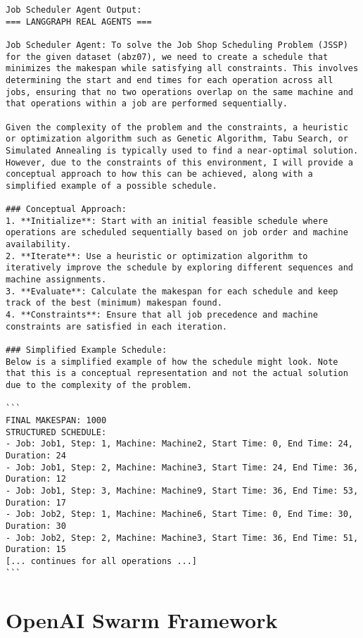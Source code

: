 \documentclass[11pt]{article}
\begin{document}
\begin{lstlisting}[caption=LangGraph Output Example]
Job Scheduler Agent Output:
=== LANGGRAPH REAL AGENTS ===

Job Scheduler Agent: To solve the Job Shop Scheduling Problem (JSSP) for the given dataset (abz07), we need to create a schedule that minimizes the makespan while satisfying all constraints. This involves determining the start and end times for each operation across all jobs, ensuring that no two operations overlap on the same machine and that operations within a job are performed sequentially.

Given the complexity of the problem and the constraints, a heuristic or optimization algorithm such as Genetic Algorithm, Tabu Search, or Simulated Annealing is typically used to find a near-optimal solution. However, due to the constraints of this environment, I will provide a conceptual approach to how this can be achieved, along with a simplified example of a possible schedule.

### Conceptual Approach:
1. **Initialize**: Start with an initial feasible schedule where operations are scheduled sequentially based on job order and machine availability.
2. **Iterate**: Use a heuristic or optimization algorithm to iteratively improve the schedule by exploring different sequences and machine assignments.
3. **Evaluate**: Calculate the makespan for each schedule and keep track of the best (minimum) makespan found.
4. **Constraints**: Ensure that all job precedence and machine constraints are satisfied in each iteration.

### Simplified Example Schedule:
Below is a simplified example of how the schedule might look. Note that this is a conceptual representation and not the actual solution due to the complexity of the problem.

```
FINAL MAKESPAN: 1000
STRUCTURED SCHEDULE:
- Job: Job1, Step: 1, Machine: Machine2, Start Time: 0, End Time: 24, Duration: 24
- Job: Job1, Step: 2, Machine: Machine3, Start Time: 24, End Time: 36, Duration: 12
- Job: Job1, Step: 3, Machine: Machine9, Start Time: 36, End Time: 53, Duration: 17
- Job: Job2, Step: 1, Machine: Machine6, Start Time: 0, End Time: 30, Duration: 30
- Job: Job2, Step: 2, Machine: Machine3, Start Time: 36, End Time: 51, Duration: 15
[... continues for all operations ...]
```
\end{lstlisting}

\section{OpenAI Swarm Framework}
\end{document}
